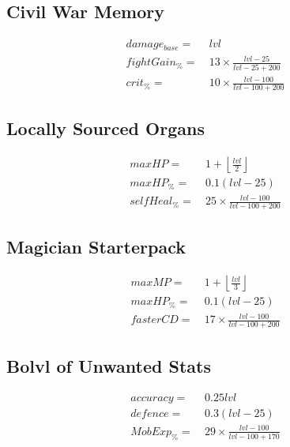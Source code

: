     \subsection{Civil War Memory}

        \begin{align*}
            damage_{base} = &\  lvl
            \\
            fightGain_\% = &\   13 \times \frac{{lvl}-25}{{lvl}-25+200}
            \\
            crit_\% = &\  10 \times \frac{{lvl}-100}{{lvl}-100+200}
        \end{align*}

    \subsection{Locally Sourced Organs}

        \begin{align*}
            maxHP = &\  1 + \left\lfloor \frac{lvl}{2} \right\rfloor 
            \\
            maxHP_\%  = &\   0.1(lvl-25)
            \\
            selfHeal_\% = &\  25 \times \frac{lvl-100}{lvl-100+200}
        \end{align*}

    \subsection{Magician Starterpack}
        \begin{align*}
            maxMP = &\  1 + \left\lfloor \frac{lvl}{3} \right\rfloor 
            \\
            maxHP_\% = &\   0.1(lvl-25)
            \\
            fasterCD = &\  17 \times \frac{{lvl}-100}{{lvl}-100+200}
        \end{align*}

    \subsection{Bo{lvl} of Unwanted Stats}
        \begin{align*}
            accuracy= &\ 0.25{lvl}  
            \\
            defence= &\  0.3(lvl-25)
            \\
            MobExp_\% = &\  29 \times \frac{{lvl}-100}{{lvl}-100+170}
        \end{align*}
